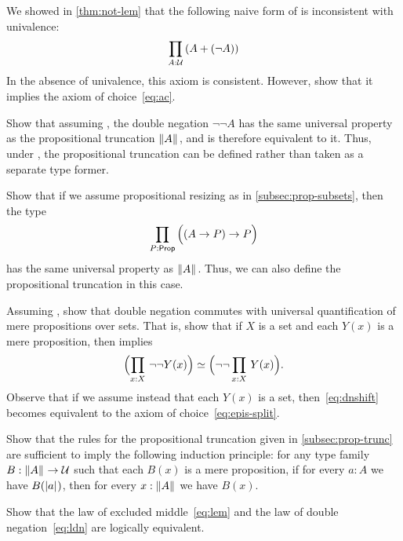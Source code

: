 \begin{ex}
  We showed in \autoref{thm:not-lem} that the following naive form of \LEM{} is inconsistent with univalence:
  \[ \prd{A:\type} (A+(\neg A)) \]
  In the absence of univalence, this axiom is consistent.
  However, show that it implies the axiom of choice~\eqref{eq:ac}.
\end{ex}

\begin{ex}\label{ex:lem-brck}
  Show that assuming \LEM{}, the double negation $\neg \neg A$ has the same universal property as the propositional truncation $\mathopen{}\left\Vert A\right\Vert_{}\mathclose{}$, and is therefore equivalent to it.
  Thus, under \LEM{}, the propositional truncation can be defined rather than taken as a separate type former.
\end{ex}

\begin{ex}\label{ex:impred-brck}
  Show that if we assume propositional resizing as in \autoref{subsec:prop-subsets}, then the type
  \[\prd{P:\prop} \Parens{(A\to P)\to P}\]
  has the same universal property as $\mathopen{}\left\Vert A\right\Vert_{}\mathclose{}$.
  Thus, we can also define the propositional truncation in this case.
\end{ex}

\begin{ex}
  Assuming \LEM{}, show that double negation commutes with universal quantification of mere propositions over sets.
  That is, show that if $X$ is a set and each $Y(x)$ is a mere proposition, then \LEM{} implies
  \begin{equation}
    \eqv{\Parens{\prd{x:X} \neg\neg Y(x)}}{\Parens{\neg\neg \prd{x:X} Y(x)}}.\label{eq:dnshift}
  \end{equation}
  Observe that if we assume instead that each $Y(x)$ is a set, then~\eqref{eq:dnshift} becomes equivalent to the axiom of choice~\eqref{eq:epis-split}.
\end{ex}

\begin{ex}\label{ex:prop-trunc-ind}
  Show that the rules for the propositional truncation given in \autoref{subsec:prop-trunc} are sufficient to imply the following induction principle: for any type family $B:\mathopen{}\left\Vert A\right\Vert_{}\mathclose{} \to \mathcal{U}$ such that each $B(x)$ is a mere proposition, if for every $a:A$ we have $B(\mathopen{}\left|a\right|_{}^{}\mathclose{})$, then for every $x:\mathopen{}\left\Vert A\right\Vert_{}\mathclose{}$ we have $B(x)$.
\end{ex}

\begin{ex}\label{ex:lem-ldn}
  Show that the law of excluded middle~\eqref{eq:lem} and the law of double negation~\eqref{eq:ldn} are logically equivalent.
\end{ex}

